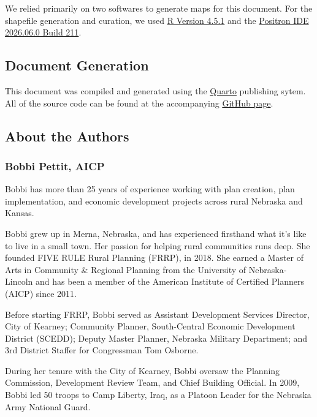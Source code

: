 \documentclass[
  letterpaper,
  DIV=11,
  numbers=noendperiod]{scrartcl}
\begin{document}
We relied primarily on two softwares to generate maps for this document.
For the shapefile generation and curation, we used
\href{https://www.r-project.org}{R Version 4.5.1} and the
\href{https://positron.posit.co/about.html}{Positron IDE 2026.06.0 Build
211}.

\subsection*{Document Generation}\label{document-generation}

This document was compiled and generated using the
\href{https://quarto.org}{Quarto} publishing sytem. All of the source
code can be found at the accompanying
\href{https://github.com/five-rule-planning/2026-Niobrara-Housing-Study}{GitHub
page}.

\subsection*{About the Authors}\label{about-the-authors}

\subsubsection*{Bobbi Pettit, AICP}\label{bobbi-pettit-aicp}

Bobbi has more than 25 years of experience working with plan creation,
plan implementation, and economic development projects across rural
Nebraska and Kansas.

Bobbi grew up in Merna, Nebraska, and has experienced firsthand what
it's like to live in a small town. Her passion for helping rural
communities runs deep. She founded FIVE RULE Rural Planning (FRRP), in
2018. She earned a Master of Arts in Community \& Regional Planning from
the University of Nebraska-Lincoln and has been a member of the American
Institute of Certified Planners (AICP) since 2011.

Before starting FRRP, Bobbi served as Assistant Development Services
Director, City of Kearney; Community Planner, South-Central Economic
Development District (SCEDD); Deputy Master Planner, Nebraska Military
Department; and 3rd District Staffer for Congressman Tom Osborne.

During her tenure with the City of Kearney, Bobbi oversaw the Planning
Commission, Development Review Team, and Chief Building Official. In
2009, Bobbi led 50 troops to Camp Liberty, Iraq, as a Platoon Leader for
the Nebraska Army National Guard.
\end{document}
